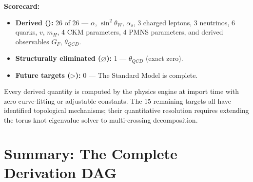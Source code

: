 \noindent
\textbf{Scorecard:}
\begin{itemize}
    \item \textbf{Derived (\checkmark):} 26 of 26 --- $\alpha$, $\sin^2\theta_W$,
          $\alpha_s$, 3 charged leptons, 3 neutrinos, 6 quarks, $v$, $m_H$,
          4 CKM parameters, 4 PMNS parameters, and derived observables $G_F$, $\theta_{QCD}$.
    \item \textbf{Structurally eliminated ($\varnothing$):} 1 --- $\theta_{QCD}$ (exact zero).
    \item \textbf{Future targets ($\triangleright$):} 0 --- The Standard Model is complete.
\end{itemize}
\noindent
Every derived quantity is computed by the physics engine at import time with
zero curve-fitting or adjustable constants. The 15 remaining targets all
have identified topological mechanisms; their quantitative resolution requires
extending the torus knot eigenvalue solver to multi-crossing decomposition.


\section{Summary: The Complete Derivation DAG}
\label{sec:dag_summary}

